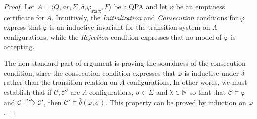 \documentclass[9pt,nocopyrightspace]{sigplanconf}
\theoremstyle{definition}
\newcommand{\tuple}[1]{\langle #1 \rangle}
\newcommand{\idx}[1]{\text{\rm\texttt{#1}}}
\newcommand{\start}{\mathsf{start}}
\renewcommand{\phi}{\varphi}
\newcommand{\config}{\mathcal{C}}
\newcommand{\ctrans}[4]{#1 \xrightarrow{#2:#3} #4}
\newcommand{\ar}{\textit{ar}}
\begin{document}
\thmcert*
\begin{proof}
  Let $A = \tuple{Q,\ar,\Sigma,\delta,\phi_\start,F}$ be a QPA and let $\phi$
  be an emptiness certificate for $A$.  Intuitively, the \emph{Initialization}
  and \emph{Consecution} conditions for $\phi$ express that $\phi$ is an
  inductive invariant for the transition system on $A$-configurations, while
  the \emph{Rejection} condition expresses that no model of $\phi$ is
  accepting.
  
  The non-standard part of argument is proving the soundness of the
  consecution condition, since the consecution condition expresses that $\phi$
  is inductive under $\hat{\delta}$ rather than the transition relation on
  $A$-configurations.  In other words, we must establish that if
  $\config,\config'$ are $A$-configurations, $\sigma \in \Sigma$ and $\idx{k}
  \in \mathbb{N}$ so that that $\config \models \phi$ and
  $\ctrans{\config}{\sigma}{\idx{k}}{\config'}$, then $\config' \models
  \hat{\delta}(\phi, \sigma)$.  This property can be proved by induction on
  $\phi$.
\end{proof}
\end{document}
